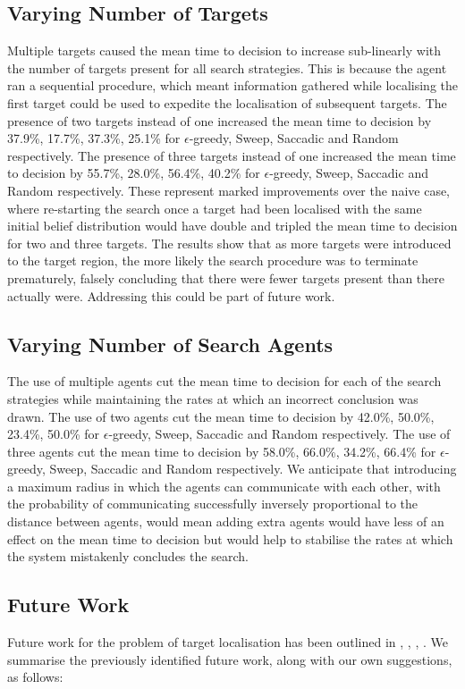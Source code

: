 \subsection{Varying Number of Targets}
Multiple targets caused the mean time to decision to increase sub-linearly with the number of targets present for all search strategies. This is because the agent ran a sequential procedure, which meant information gathered while localising the first target could be used to expedite the localisation of subsequent targets. The presence of two targets instead of one increased the mean time to decision by 37.9\%, 17.7\%, 37.3\%, 25.1\% for $\epsilon$-greedy, Sweep, Saccadic and Random respectively. The presence of three targets instead of one increased the mean time to decision by 55.7\%,  28.0\%, 56.4\%, 40.2\% for $\epsilon$-greedy, Sweep, Saccadic and Random respectively. These represent marked improvements over the naive case, where re-starting the search once a target had been localised with the same initial belief distribution would have double and tripled the mean time to decision for two and three targets. The results show that as more targets were introduced to the target region, the more likely the search procedure was to terminate prematurely, falsely concluding that there were fewer targets present than there actually were. Addressing this could be part of future work.\par

\subsection{Varying Number of Search Agents}
The use of multiple agents cut the mean time to decision for each of the search strategies while maintaining the rates at which an incorrect conclusion was drawn. The use of two agents cut the mean time to decision by 42.0\%, 50.0\%, 23.4\%, 50.0\% for $\epsilon$-greedy, Sweep, Saccadic and Random respectively. The use of three agents cut the mean time to decision by 58.0\%, 66.0\%, 34.2\%, 66.4\% for $\epsilon$-greedy, Sweep, Saccadic and Random respectively. We anticipate that introducing a maximum radius in which the agents can communicate with each other, with the probability of communicating successfully inversely proportional to the distance between agents, would mean adding extra agents would have less of an effect on the mean time to decision but would help to stabilise the rates at which the system mistakenly concludes the search.

\subsection{Future Work}
Future work for the problem of target localisation has been outlined in \cite{Chung2007ASearch}, \cite{Chung2008Multi-agentFramework}, \cite{Chung2012AnalysisStrategies}, \cite{Kriheli2016OptimalInspections}. We summarise the previously identified future work, along with our own suggestions, as follows:

